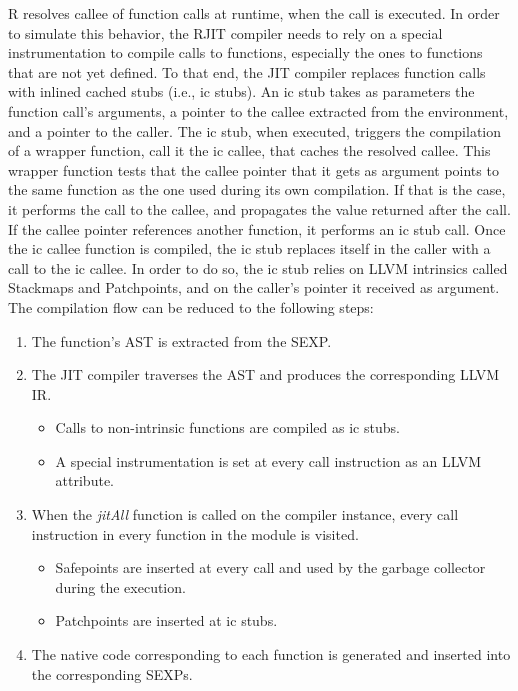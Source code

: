 R resolves callee of function calls at runtime, when the call is executed.
In order to simulate this behavior, the RJIT compiler needs to rely on a special instrumentation to compile calls to functions, especially the ones to functions that are not yet defined.
To that end, the JIT compiler replaces function calls with inlined cached stubs (i.e., ic stubs).
An ic stub takes as parameters the function call's arguments, a pointer to the callee extracted from the environment, and a pointer to the caller.
The ic stub, when executed, triggers the compilation of a wrapper function, call it the ic callee, that caches the resolved callee.
This wrapper function tests that the callee pointer that it gets as argument points to the same function as the one used during its own compilation.
If that is the case, it performs the call to the callee, and propagates the value returned after the call.
If the callee pointer references another function, it performs an ic stub call.
Once the ic callee function is compiled, the ic stub replaces itself in the caller with a call to the ic callee.
In order to do so, the ic stub relies on LLVM intrinsics called Stackmaps\cite{llvmStackMap} and Patchpoints\cite{llvmPatchpoints}, and on the caller's pointer it received as argument.\\

The compilation flow can be reduced to the following steps:
\begin{enumerate}
    \item The function's AST is extracted from the SEXP.
    \item The JIT compiler traverses the AST and produces the corresponding LLVM IR.
        \begin{itemize}
        \item Calls to non-intrinsic functions are compiled as ic stubs.
        \item A special instrumentation is set at every call instruction as an LLVM attribute\cite{llvmAttribute}.
        \end{itemize}
    \item When the \textit{jitAll} function is called on the compiler instance, every call instruction in every function in the module is visited.\label{jitAll}
        \begin{itemize}
        \item Safepoints are inserted at every call and used by the garbage collector during the execution.
        \item Patchpoints\cite{llvmPatchpoints} are inserted at ic stubs.
        \end{itemize}
    \item The native code corresponding to each function is generated and inserted into the corresponding SEXPs.
\end{enumerate}


